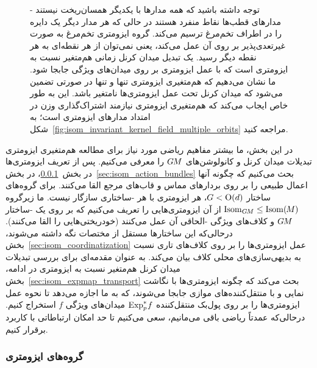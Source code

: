 \begin{figure}
{        توجه داشته باشید که همه مدارها با یکدیگر همسان‌ریخت نیستند - مدارهای قطب‌ها نقاط منفرد هستند در حالی که هر مدار دیگر یک دایره را در اطراف تخم‌مرغ ترسیم می‌کند.
        گروه ایزومتری تخم‌مرغ به صورت غیرتعدی‌پذیر بر روی آن عمل می‌کند، یعنی نمی‌توان از هر نقطه‌ای به هر نقطه دیگر رسید.
        یک تبدیل میدان کرنل زمانی هم‌متغیر نسبت به ایزومتری است که با عمل ایزومتری بر روی میدان‌های ویژگی جابجا شود.
        ما نشان می‌دهیم که هم‌متغیری ایزومتری تنها و تنها در صورتی تضمین می‌شود که میدان کرنل تحت عمل ایزومتری‌ها نامتغیر باشد.
        این به طور خاص ایجاب می‌کند که هم‌متغیری ایزومتری نیازمند اشتراک‌گذاری وزن در امتداد مدارهای ایزومتری است؛ به شکل~\ref{fig:isom_invariant_kernel_field_multiple_orbits} مراجعه کنید.
    }
    \label{fig:isom_egg_main}
\end{figure}


در این بخش، ما بیشتر مفاهیم ریاضی مورد نیاز برای مطالعه هم‌متغیری ایزومتری تبدیلات میدان کرنل و کانولوشن‌های $G\mkern-1.4muM$ را معرفی می‌کنیم.
پس از تعریف ایزومتری‌ها در بخش~\ref{sec:isometry_groups}، در بخش~\ref{sec:isom_action_bundles} بحث می‌کنیم که چگونه آنها اعمال طبیعی را بر روی بردارهای مماس و قاب‌های مرجع القا می‌کنند.
برای گروه‌های ساختار $G<\operatorname{O}(d)$، هر ایزومتری با هر -ساختاری سازگار نیست.
ما زیرگروه $\operatorname{Isom}_{G\mkern-1.4muM} \leq \operatorname{Isom}(\mkern-1.5mu M \mkern-.5mu)$ از آن ایزومتری‌هایی را تعریف می‌کنیم که بر روی یک -ساختار $G\mkern-1.4muM$ و کلاف‌های ویژگی -الحاقی آن عمل می‌کنند (خودریختی‌هایی را القا می‌کنند).
درحالی‌که این ساختارها مستقل از مختصات نگه داشته می‌شوند، بخش~\ref{sec:isom_coordinatization} عمل ایزومتری‌ها را بر روی کلاف‌های تاری نسبت به بدیهی‌سازی‌های محلی کلاف بیان می‌کند.
به عنوان مقدمه‌ای برای بررسی تبدیلات میدان کرنل هم‌متغیر نسبت به ایزومتری در ادامه، بخش~\ref{sec:isom_expmap_transport} بحث می‌کند که چگونه ایزومتری‌ها با نگاشت نمایی و با منتقل‌کننده‌های موازی جابجا می‌شوند، که به ما اجازه می‌دهد تا نحوه عمل ایزومتری‌ها را بر روی پول‌بک منتقل‌کننده $\operatorname{Exp}^*_p\mkern-2mu f$ میدان‌های ویژگی $f$ استخراج کنیم.
درحالی‌که عمدتاً ریاضی باقی می‌مانیم، سعی می‌کنیم تا حد امکان ارتباطاتی با کاربرد برقرار کنیم.


\subsubsection{گروه‌های ایزومتری}
\label{sec:isometry_groups}

